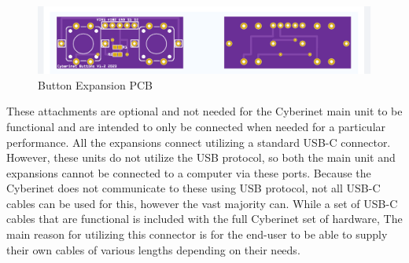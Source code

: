 \begin{center}
    \begin{figure}
        \centering
        \includegraphics[scale=0.5]{diagrams/PCBs/buttons1.2.png}
        \caption{Button Expansion PCB}
        \label{fig:buttonPCB}
    \end{figure}
\end{center}


These attachments are optional and not needed for the Cyberinet main unit to be functional and are intended to only be connected when needed for a particular performance. All the expansions connect utilizing a standard USB-C connector. However, these units do not utilize the USB protocol, so both the main unit and expansions cannot be connected to a computer via these ports. Because the Cyberinet does not communicate to these using USB protocol, not all USB-C cables can be used for this, however the vast majority can. While a set of USB-C cables that are functional is included with the full Cyberinet set of hardware, The main reason for utilizing this connector is for the end-user to be able to supply their own cables of various lengths depending on their needs. 


